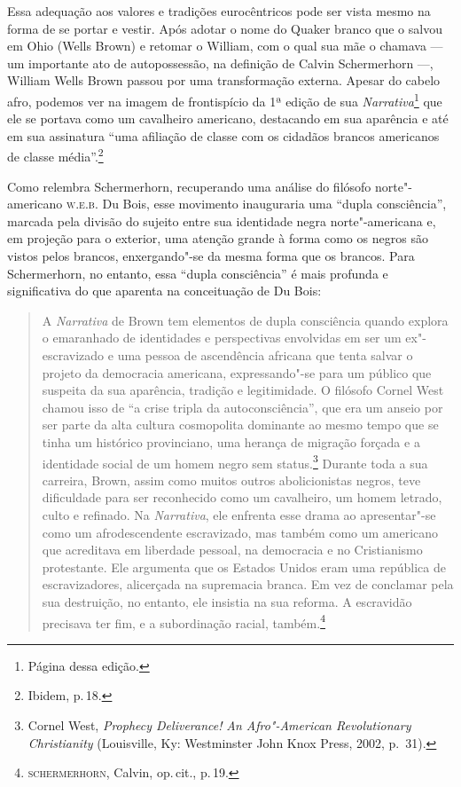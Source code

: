 Essa adequação aos valores e tradições eurocêntricos pode ser vista mesmo na forma de se portar e vestir. Após adotar o nome do Quaker branco que o salvou em Ohio (Wells Brown) e retomar o William, com o qual sua mãe o chamava --- um importante ato de autopossessão, na definição de Calvin Schermerhorn ---, William Wells Brown passou por uma transformação externa. Apesar do cabelo afro, podemos ver na imagem de frontispício da 1ª edição de sua \emph{Narrativa}\footnote{Página \pageref{front} dessa edição.} que ele se portava como um cavalheiro americano, destacando em sua aparência e até em sua assinatura
``uma afiliação de classe com os cidadãos
brancos americanos de classe média''.\footnote{Ibidem, p.\,18.}

Como relembra Schermerhorn, recuperando uma análise do
filósofo norte"-americano \textsc{w.e.b.} Du Bois, esse movimento inauguraria uma ``dupla
consciência'', marcada pela divisão do sujeito entre sua identidade negra norte"-americana e, em projeção para o exterior, uma atenção grande à forma como os negros são vistos pelos brancos, enxergando"-se da mesma forma que os brancos. 
Para Schermerhorn, no entanto, essa ``dupla consciência'' é mais profunda e significativa do que aparenta na conceituação de Du Bois:

\begin{quote}
A \emph{Narrativa} de Brown tem elementos de dupla consciência quando
explora o emaranhado de identidades e perspectivas envolvidas em ser um
ex"-escravizado e uma pessoa de ascendência africana que tenta salvar o
projeto da democracia americana, expressando"-se para um público que
suspeita da sua aparência, tradição e legitimidade. O filósofo Cornel
West chamou isso de ``a crise tripla da autoconsciência'', que era um
anseio por ser parte da alta cultura cosmopolita dominante ao mesmo
tempo que se tinha um histórico provinciano, uma herança de migração
forçada e a identidade social de um homem negro sem status.\footnote{Cornel
  West, \emph{Prophecy Deliverance!} \emph{An Afro"-American
  Revolutionary Christianity} (Louisville, Ky: Westminster John Knox
  Press, 2002, p.~31).} Durante toda a sua carreira, Brown, assim como
muitos outros abolicionistas negros, teve dificuldade para ser
reconhecido como um cavalheiro, um homem letrado, culto e refinado. Na
\emph{Narrativa}, ele enfrenta esse drama ao apresentar"-se como um
afrodescendente escravizado, mas também como um americano que acreditava
em liberdade pessoal, na democracia e no Cristianismo protestante. Ele
argumenta que os Estados Unidos eram uma república de escravizadores,
alicerçada na supremacia branca. Em vez de conclamar pela sua
destruição, no entanto, ele insistia na sua reforma. A escravidão
precisava ter fim, e a subordinação racial, também.\footnote{\textsc{schermerhorn}, Calvin, op.\,cit., p.\,19.}
\end{quote}